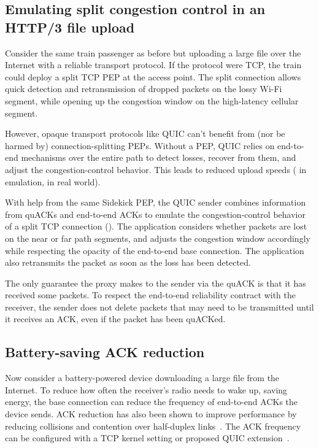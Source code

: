 \subsection{Emulating split congestion control in an HTTP/3 file upload}
\label{sec:sidekick:motivating:http}

Consider the same train passenger as before but uploading a large file over the
Internet with a reliable transport protocol. If the protocol were TCP, the
train could deploy a split TCP PEP at the access point. The split connection
allows quick detection and retransmission of dropped packets on the lossy Wi-Fi
segment, while opening up the congestion window on the high-latency cellular
segment.

However, opaque transport protocols like QUIC can't benefit from (nor be harmed
by) connection-splitting PEPs. Without a PEP, QUIC relies on end-to-end
mechanisms over the entire path to detect losses, recover from them, and adjust
the congestion-control behavior. This leads to reduced upload speeds
( in emulation,  in real world).

With help from the same Sidekick PEP, the QUIC sender combines information from
quACKs and end-to-end ACKs to emulate the congestion-control behavior of a
split TCP connection (). The
application considers whether packets are lost on the near or far path
segments, and adjusts the congestion window accordingly while respecting the
opacity of the end-to-end base connection. The application also retransmits the
packet as soon as the loss has been detected.

The only guarantee the proxy makes to the sender via the quACK is that it has
received some packets. To respect the end-to-end reliability contract with the
receiver, the sender does not delete packets that may need to be transmitted
until it receives an ACK, even if the packet has been quACKed.

\subsection{Battery-saving ACK reduction}
\label{sec:sidekick:motivating:ack-reduction}

Now consider a battery-powered device downloading a large file from the
Internet. To reduce how often the receiver's
radio needs to wake up, saving energy, the base connection can reduce the
frequency of end-to-end ACKs the device sends.
ACK reduction has also been shown to improve performance by reducing collisions
and contention over half-duplex links~\cite{custura2023reducing,li2020tack}.
The ACK frequency can be configured with a TCP kernel setting or proposed
QUIC extension~\cite{ietf-quic-ack-frequency-07}.

